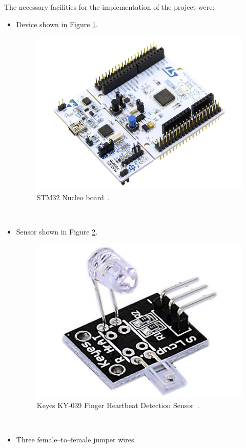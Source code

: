 \documentclass[11pt,a4paper]{article}
\begin{document}
The necessary facilities for the implementation of the project were:\\[-1.5em]
\begin{itemize}
    \item Device shown in Figure \ref{fig:platform}.
        \begin{figure}[H]
            \centering
            \includegraphics[scale=0.4]{img/device1.jpg}
            \caption{STM32 Nucleo board~\cite{IMG-DEVICE-1}.}
            \label{fig:platform}
        \end{figure}
        \hfill\\[-17mm]
    \item Sensor shown in Figure \ref{fig:senzor}.
        \begin{figure}[H]
            \centering
            \includegraphics[scale=0.3]{img/sensor1.jpg}
            \caption{Keyes KY-039 Finger Heartbeat Detection Sensor~\cite{IMG-SENSOR-1}.}
            \label{fig:senzor}
        \end{figure}
        \hfill\\[-18mm]
    \item Three female--to--female jumper wires.\\[-2.5mm]
\end{itemize}
\end{document}
